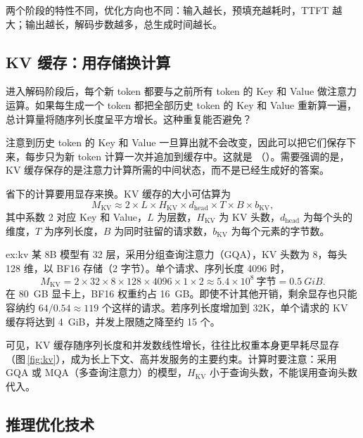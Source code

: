 

两个阶段的特性不同，优化方向也不同：输入越长，预填充越耗时，TTFT 越大；输出越长，解码步数越多，总生成时间越长。

\subsection{KV 缓存：用存储换计算}
\label{subsec:kvcache}

进入解码阶段后，每个新 token 都要与之前所有 token 的 Key 和 Value 做注意力运算。如果每生成一个 token 都把全部历史 token 的 Key 和 Value 重新算一遍，总计算量将随序列长度呈平方增长。这种重复能否避免？

注意到历史 token 的 Key 和 Value 一旦算出就不会改变，因此可以把它们保存下来，每步只为新 token 计算一次并追加到缓存中。这就是 （）。需要强调的是，KV 缓存保存的是注意力计算所需的中间状态，而不是已经生成好的答案。

省下的计算要用显存来换。KV 缓存的大小可估算为
\begin{equation}
  M_{\mathrm{KV}} \approx 2 \times L \times H_{\mathrm{KV}} \times d_{\mathrm{head}} \times T \times B \times b_{\mathrm{KV}},
  \label{eq:kv}
\end{equation}
其中系数 2 对应 Key 和 Value，$L$ 为层数，$H_{\mathrm{KV}}$ 为 KV 头数，$d_{\mathrm{head}}$ 为每个头的维度，$T$ 为序列长度，$B$ 为同时驻留的请求数，$b_{\mathrm{KV}}$ 为每个元素的字节数。

\begin{example}[KV 缓存与并发上限]{ex:kv}
某 8B 模型有 32 层，采用分组查询注意力（GQA），KV 头数为 8，每头 128 维，以 BF16 存储（2 字节）。单个请求、序列长度 4096 时，
\[
  M_{\mathrm{KV}} = 2\times32\times8\times128\times4096\times1\times2 \approx 5.4\times10^{8}\ \text{字节} = \SI{0.5}{GiB}.
\]
在 \SI{80}{GB} 显卡上，BF16 权重约占 \SI{16}{GB}。即使不计其他开销，剩余显存也只能容纳约 $64/0.54\approx 119$ 个这样的请求。若序列长度增加到 32K，单个请求的 KV 缓存将达到 \SI{4}{GiB}，并发上限随之降至约 15 个。
\end{example}

可见，KV 缓存随序列长度和并发数线性增长，往往比权重本身更早耗尽显存（图\,\ref{fig:kv}），成为长上下文、高并发服务的主要约束。计算时要注意：采用 GQA 或 MQA（多查询注意力）的模型，$H_{\mathrm{KV}}$ 小于查询头数，不能误用查询头数代入。



\subsection{推理优化技术}
\label{subsec:infer-opt}

